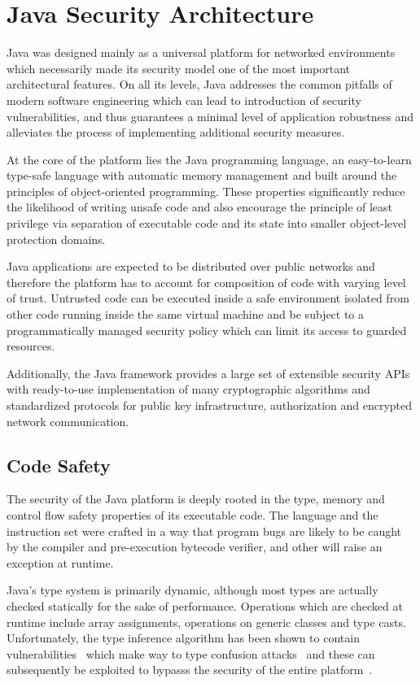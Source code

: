 \documentclass[a4paper,12pt,twoside,openright]{report}
\begin{document}
\section{Java Security Architecture}

Java was designed mainly as a universal platform for networked environments which necessarily made its security model one of the most important architectural features. On all its levels, Java addresses the common pitfalls of modern software engineering which can lead to introduction of security vulnerabilities, and thus guarantees a minimal level of application robustness and alleviates the process of implementing additional security measures.

At the core of the platform lies the Java programming language, an easy-to-learn type-safe language with automatic memory management and built around the principles of object-oriented programming. These properties significantly reduce the likelihood of writing unsafe code and also encourage the principle of least privilege via separation of executable code and its state into smaller object-level protection domains.

Java applications are expected to be distributed over public networks and therefore the platform has to account for composition of code with varying level of trust. Untrusted code can be executed inside a safe environment isolated from other code running inside the same virtual machine and be subject to a programmatically managed security policy which can limit its access to guarded resources.

Additionally, the Java framework provides a large set of extensible security APIs with ready-to-use implementation of many cryptographic algorithms and standardized protocols for public key infrastructure, authorization and encrypted network communication. 

\subsection{Code Safety}

The security of the Java platform is deeply rooted in the type, memory and control flow safety properties of its executable code. The language and the instruction set were crafted in a way that program bugs are likely to be caught by the compiler and pre-execution bytecode verifier, and other will raise an exception at runtime. 

Java's type system is primarily dynamic, although most types are actually checked statically for the sake of performance. Operations which are checked at runtime include array assignments, operations on generic classes and type casts. Unfortunately, the type inference algorithm has been shown to contain vulnerabilities~\cite{Suenaga:2012:JavaVulnerability} which make way to type confusion attacks~\cite{Oh:2012:JavaExploitReport} and these can subsequently be exploited to bypasss the security of the entire platform~\cite{McGraw:1999:SJG:298616}.
\end{document}
